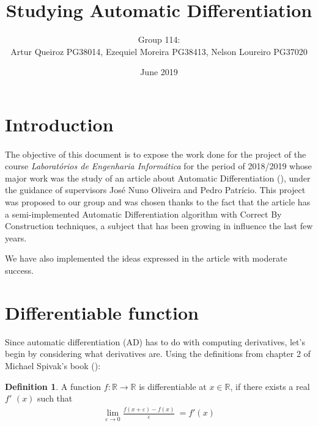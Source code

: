 \documentclass[11pt,a4]{article}
\title{Studying Automatic Differentiation}
\author{Group 114:\\
	Artur Queiroz PG38014, Ezequiel Moreira PG38413, Nelson Loureiro PG37020}
\date{June 2019}
\def\R{\mathbb{R}}
\theoremstyle{definition}
\newtheorem{defi}{Definition}[section]
\theoremstyle{Definition}
\theoremstyle{Definition}
\begin{document}
	
	\maketitle
	
	\section{Introduction}
	\paragraph{} The objective of this document is to expose the work done for the project of the course \emph{Laboratórios de Engenharia Informática} for the period of 2018/2019 whose major work was the study of an article about
	Automatic Differentiation (\cite{Elliott:2018}), under the guidance of supervisors José Nuno Oliveira and Pedro Patrício. This project was proposed to our group and was chosen thanks to the fact that the article has a semi-implemented Automatic Differentiation algorithm with Correct By Construction techniques, a subject that has been growing in influence the last few years. 
	\par We have also implemented the ideas expressed in the article with moderate success.
	
	
	
\section{Differentiable function}
	
	Since automatic differentiation (AD) has to do with computing derivatives, let’s begin by considering
	what derivatives are. Using the definitions from chapter 2 of Michael Spivak's book (\cite{book}):
	
	\begin{defi}
		A function $f:\R \to \R$ is differentiable at $x \in \R$, if there exists a real \newline $f $$'$ $(x)$ such that
		\begin{align*}
		\lim_{\varepsilon \to 0} \frac{\textit{$f(x+\varepsilon)-f(x)$}}{\varepsilon} \ = \textit{$f'(x)$}  
		\end{align*}
	\end{defi}
	
\end{document}
